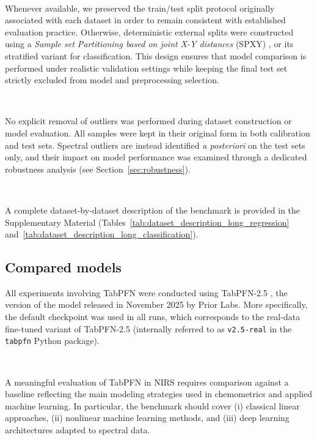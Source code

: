 \documentclass{article}
\begin{document}
~

Whenever available, we preserved the train/test split protocol originally associated with each dataset in order to remain consistent with established evaluation practice. Otherwise, deterministic external splits were constructed using a \textit{Sample set Partitioning based on joint X-Y distances} (SPXY) \cite{Galvao2005KS}, or its stratified variant for classification. This design ensures that model comparison is performed under realistic validation settings while keeping the final test set strictly excluded from model and preprocessing selection. 

~

No explicit removal of outliers was performed during dataset construction or model evaluation. All samples were kept in their original form in both calibration and test sets. Spectral outliers are instead identified \emph{a posteriori} on the test sets only, and their impact on model performance was examined through a dedicated robustness analysis (see Section~\ref{sec:robustness}).

~

A complete dataset-by-dataset description of the benchmark is provided in the Supplementary Material (Tables~\ref{tab:dataset_description_long_regression} and~\ref{tab:dataset_description_long_classification}).



\FloatBarrier

\subsection{Compared models}

All experiments involving TabPFN were conducted using TabPFN-2.5 \cite{grinsztajn_tabpfn-25_2026}, the version of the model released in November 2025 by Prior Labs. More specifically, the default checkpoint was used in all runs, which corresponds to the real-data fine-tuned variant of TabPFN-2.5 (internally referred to as \texttt{v2.5-real} in the \texttt{tabpfn} Python package).

~

A meaningful evaluation of TabPFN in NIRS requires comparison against a baseline reflecting the main modeling strategies used in chemometrics and applied machine learning. In particular, the benchmark should cover (i) classical linear approaches, (ii) nonlinear machine learning methods, and (iii) deep learning architectures adapted to spectral data.

~
\end{document}

